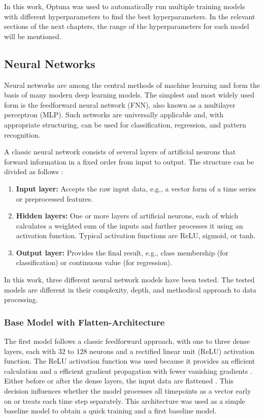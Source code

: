 In this work, Optuna was used to automatically run multiple training models with different hyperparameters to find the best hyperparameters.
In the relevant sections of the next chapters, the range of the hyperparameters for each model will be mentioned.

\subsection{Neural Networks}
\label{chap:nn}

Neural networks are among the central methods of machine learning and form the basis of many modern deep learning models.
The simplest and most widely used form is the feedforward neural network (FNN), also known as a multilayer perceptron (MLP).
Such networks are universally applicable and, with appropriate structuring, can be used for classification, regression, and pattern recognition.

A classic neural network consists of several layers of artificial neurons that forward information in a fixed order from input to output.
The structure can be divided as follows \cite{nn-basics}:

\begin{enumerate}
    \item \textbf{Input layer:} Accepts the raw input data, e.g., a vector form of a time series or preprocessed features.
    \item \textbf{Hidden layers:} One or more layers of artificial neurons, each of which calculates a weighted sum of the inputs and further processes it using an activation function.
    Typical activation functions are ReLU, sigmoid, or tanh.
    \item \textbf{Output layer:} Provides the final result, e.g., class membership (for classification) or continuous value (for regression).
\end{enumerate}

\noindent
In this work, three different neural network models have been tested.
The tested models are different in their complexity, depth, and methodical approach to data processing.

\subsubsection{Base Model with Flatten-Architecture}

The first model follows a classic feedforward approach, with one to three dense layers, each with 32 to 128 neurons and a rectified linear unit (ReLU) activation function.
The ReLU activation function was used because it provides an efficient calculation and a efficient gradient propagation with fewer vanishing gradients \cite{springer-ml-basics}.
Either before or after the dense layers, the input data are flattened \cite{keras-flatten}.
This decision influences whether the model processes all timepoints as a vector early on or treats each time step separately.
This architecture was used as a simple baseline model to obtain a quick training and a first baseline model.

